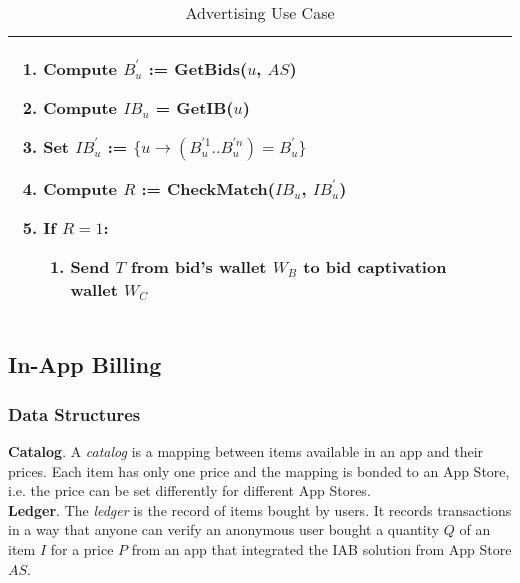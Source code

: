 \begin{table}[H]
\begin{tabular}{|p{}p{}|}
\begin{itemize}
\end{itemize}
\begin{enumerate}
	\item Compute $B^{'}_{u}$ := \textsf{GetBids}($u$, $AS$)
	\item Compute $IB_u$ = \textsf{GetIB}($u$)
	\item Set $IB^{'}_{u}$ := $\{u \to (B^{'1}_{u}..B^{'n}_{u}) = B^{'}_{u}\}$
	\item Compute $R$ := \textsf{CheckMatch}($IB_u$, $IB^{'}_{u}$)
	\item If $R = 1$:
	\begin{enumerate}
		\item Send $T$ from bid's wallet $W_B$ to bid captivation wallet $W_C$
	\end{enumerate}
\end{enumerate} & \\
\hline
\end{tabular}
\caption{Advertising Use Case}
\label{table: ads_use_case}
\end{table}

\subsection{In-App Billing}

\subsubsection{Data Structures}

\noindent \textbf{Catalog}. A \textit{catalog} is a mapping between items available in an app and their prices. Each item has only one price and the mapping is bonded to an App Store, i.e. the price can be set differently for different App Stores. \\

\noindent \textbf{Ledger}. The \textit{ledger} is the record of items bought by users. It records transactions in a way that anyone can verify an anonymous user bought a quantity $Q$ of an item $I$ for a price $P$ from an app that integrated the IAB solution from App Store $AS$.

